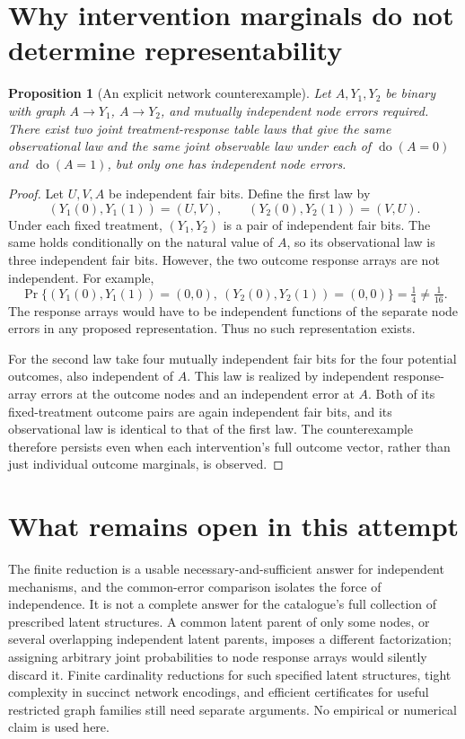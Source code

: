 \documentclass[11pt]{article}
\newtheorem{proposition}[theorem]{Proposition}
\theoremstyle{remark}
\begin{document}
\section{Why intervention marginals do not determine representability}
\begin{proposition}[An explicit network counterexample]
Let $A,Y_1,Y_2$ be binary with graph $A\to Y_1$, $A\to Y_2$, and mutually independent node errors required. There exist two joint treatment-response table laws that give the same observational law and the same joint observable law under each of $\operatorname{do}(A=0)$ and $\operatorname{do}(A=1)$, but only one has independent node errors.
\end{proposition}
\begin{proof}
Let $U,V,A$ be independent fair bits. Define the first law by
\[
 (Y_1(0),Y_1(1))=(U,V),\qquad
 (Y_2(0),Y_2(1))=(V,U).
\]
Under each fixed treatment, $(Y_1,Y_2)$ is a pair of independent fair bits. The same holds conditionally on the natural value of $A$, so its observational law is three independent fair bits. However, the two outcome response arrays are not independent. For example,
\[
 \Pr\{(Y_1(0),Y_1(1))=(0,0),\ (Y_2(0),Y_2(1))=(0,0)\}
   =\tfrac14\ne\tfrac1{16}.
\]
The response arrays would have to be independent functions of the separate node errors in any proposed representation. Thus no such representation exists.

For the second law take four mutually independent fair bits for the four potential outcomes, also independent of $A$. This law is realized by independent response-array errors at the outcome nodes and an independent error at $A$. Both of its fixed-treatment outcome pairs are again independent fair bits, and its observational law is identical to that of the first law. The counterexample therefore persists even when each intervention's full outcome vector, rather than just individual outcome marginals, is observed.
\end{proof}

\section{What remains open in this attempt}
The finite reduction is a usable necessary-and-sufficient answer for independent mechanisms, and the common-error comparison isolates the force of independence. It is not a complete answer for the catalogue's full collection of prescribed latent structures. A common latent parent of only some nodes, or several overlapping independent latent parents, imposes a different factorization; assigning arbitrary joint probabilities to node response arrays would silently discard it. Finite cardinality reductions for such specified latent structures, tight complexity in succinct network encodings, and efficient certificates for useful restricted graph families still need separate arguments. No empirical or numerical claim is used here.
\end{document}
